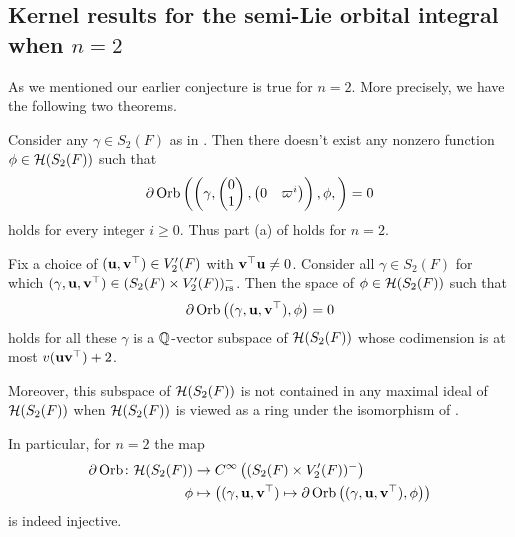 \subsection{Kernel results for the semi-Lie orbital integral when $n=2$}
As we mentioned our earlier conjecture 
is true for $n = 2$.
More precisely, we have the following two theorems.

\begin{theorem}
  \label{thm:semi_lie_ker_trivial}
  Consider any $\gamma \in S_2(F)$ as in .
  Then there doesn't exist any nonzero function $\phi \in \mathcal H(S_2(F))$ such that
  \[ \partial \operatorname{Orb} \left(
      \left( \gamma, \begin{pmatrix} 0 \\ 1 \end{pmatrix}, \begin{pmatrix} 0 & \varpi^i \end{pmatrix} \right),
      \phi, \right) = 0 \]
  holds for every integer $i \ge 0$.
  Thus part (a) of  holds for $n = 2$.
\end{theorem}

\begin{theorem}
  \label{thm:semi_lie_ker_huge}
  Fix a choice of $(\mathbf u, \mathbf v^\top) \in V_2'(F)$ with $\mathbf v^\top \mathbf u \neq 0$.
  Consider all $\gamma \in S_2(F)$ for which ${(\gamma, \mathbf u, \mathbf v^\top)} \in (S_2(F) \times V'_2(F))_{\mathrm{rs}}^-$.
  Then the space of $\phi \in \mathcal H(S_2(F))$ such that
  \[ \partial \operatorname{Orb} \left( {(\gamma, \mathbf u, \mathbf v^\top)}, \phi \right) = 0 \]
  holds for all these $\gamma$ is a $\mathbb Q$-vector subspace of $\mathcal H(S_2(F))$
  whose codimension is at most $v(\mathbf u \mathbf v^\top) + 2$.

  Moreover, this subspace of $\mathcal H(S_2(F))$
  is not contained in any maximal ideal of $\mathcal H(S_2(F))$
  when $\mathcal H(S_2(F))$ is viewed as a ring under the isomorphism of .
\end{theorem}

In particular, for $n=2$ the map
\begin{align*}
  \partial\operatorname{Orb} \colon \mathcal H(S_2(F)) &\to C^\infty\left( (S_2(F) \times V'_2(F))^- \right) \\
  \phi &\mapsto \left( {(\gamma, \mathbf u, \mathbf v^\top)} \mapsto \partial \operatorname{Orb} \left({(\gamma, \mathbf u, \mathbf v^\top)}, \phi \right) \right)
\end{align*}
is indeed injective.

